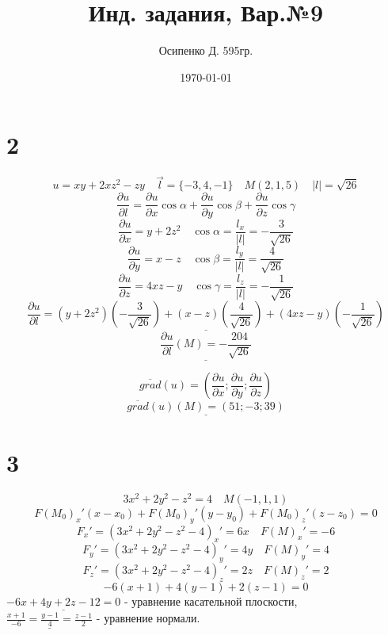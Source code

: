 \documentclass[a4paper, 12pt]{article}
\title{Инд. задания, Вар.№9}
\author{Осипенко Д. 595гр.}
\date{\today}
\begin{document}
\sffamily
\maketitle
\section*{2}
\[
	u = xy + 2xz^2 - zy \quad \vec{l}=\{-3,4,-1\} \quad M(2,1,5) \quad |l| = \sqrt{26}
\]
\[
	\frac{\partial u}{\partial l} = \frac{\partial u}{\partial x}\cos \alpha  + \frac{\partial u}{\partial y} \cos \beta + \frac{\partial u}{\partial z} \cos \gamma
\]
\[
	\frac{\partial u}{\partial x} = y+2z^2 \quad \cos \alpha = \frac{l_x}{|l|} = -\frac{3}{\sqrt{26}}	
\]
\[
	\frac{\partial u}{\partial y} = x-z \quad \cos \beta  = \frac{l_y}{|l|} = \frac{4}{\sqrt{26}}	
\]
\[
	\frac{\partial u}{\partial z} = 4xz-y \quad \cos \gamma = \frac{l_z}{|l|} = -\frac{1}{\sqrt{26}}	
\]
\[
	\underline{\frac{\partial u}{\partial l} = (y+2z^2)(-\frac{3}{\sqrt{26}})  + (x-z)(\frac{4}{\sqrt{26}})  + (4xz-y)(-\frac{1}{\sqrt{26}})}
\]
\[
	\underline{\frac{\partial u}{\partial l}(M) = -\frac{204}{\sqrt{26}}}
\]

\[
	\overline{grad}(u) =\left(\frac{\partial u}{\partial x};\frac{\partial u}{\partial y};\frac{\partial u}{\partial z}\right)
\]
\[
	\underline{\overline{grad}(u)(M) = (51;-3;39)}
\]

\section*{3}
\[
	3x^2 + 2 y^2 - z^2 = 4 \quad M(-1,1,1)
\]
\[
	F(M_0)_x'(x-x_0)+F(M_0)_y'(y-y_0)+F(M_0)_z'(z-z_0) = 0
\]
\[
	F_x' = (3x^2 + 2 y^2 - z^2 - 4)_x'= 6x \quad F(M)_x' = -6
\]
\[
	F_y' = (3x^2 + 2 y^2 - z^2 - 4)_y'= 4y \quad F(M)_y' = 4
\]
\[
	F_z' = (3x^2 + 2 y^2 - z^2 - 4)_z'= 2z \quad F(M)_z' = 2
\]
\[
	-6(x+1) + 4(y-1)+2(z-1) = 0
\]
$\underline{-6x +4y +2z -12 = 0}$ - уравнение касательной плоскости,\\ $\underline{\frac{x + 1}{-6} = \frac{y - 1}{4} = \frac{z - 1}{2}}$ - уравнение  нормали.
\end{document}
